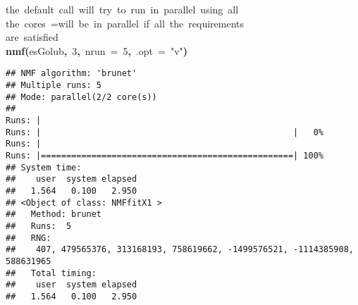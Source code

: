 \documentclass[a4paper]{article}\usepackage{graphicx, color}
\makeatletter
\newcommand{\hlnumber}[1]{\textcolor[rgb]{0,0,0}{#1}}%
\newcommand{\hlfunctioncall}[1]{\textcolor[rgb]{0.501960784313725,0,0.329411764705882}{\textbf{#1}}}%
\newcommand{\hlstring}[1]{\textcolor[rgb]{0.6,0.6,1}{#1}}%
\newcommand{\hlkeyword}[1]{\textcolor[rgb]{0,0,0}{\textbf{#1}}}%
\newcommand{\hlargument}[1]{\textcolor[rgb]{0.690196078431373,0.250980392156863,0.0196078431372549}{#1}}%
\newcommand{\hlcomment}[1]{\textcolor[rgb]{0.180392156862745,0.6,0.341176470588235}{#1}}%
\newcommand{\hlsymbol}[1]{\textcolor[rgb]{0,0,0}{#1}}%
\newcommand{\hlstd}[1]{\textcolor[rgb]{0,0,0}{#1}}%
\newenvironment{kframe}{%
 \def\FrameCommand##1{\hskip\@totalleftmargin \hskip-\fboxsep
 \colorbox{shadecolor}{##1}\hskip-\fboxsep
     \hskip-\linewidth \hskip-\@totalleftmargin \hskip\columnwidth}%
 \MakeFramed {\advance\hsize-\width
   \@totalleftmargin\z@ \linewidth\hsize
   \@setminipage}}%
 {\par\unskip\endMakeFramed}
\newenvironment{knitrout}{}{} %
\makeatother
\begin{document}
\begin{knitrout}
\color{fgcolor}\begin{kframe}
\begin{flushleft}
\ttfamily\noindent
\hlcomment{\usebox{\hlnormalsizeboxhash}{\ }the{\ }default{\ }call{\ }will{\ }try{\ }to{\ }run{\ }in{\ }parallel{\ }using{\ }all}\hspace*{\fill}\\
\hlstd{}\hlcomment{\usebox{\hlnormalsizeboxhash}{\ }the{\ }cores{\ }=\usebox{\hlnormalsizeboxgreaterthan}{\ }will{\ }be{\ }in{\ }parallel{\ }if{\ }all{\ }the{\ }requirements}\hspace*{\fill}\\
\hlstd{}\hlcomment{\usebox{\hlnormalsizeboxhash}{\ }are{\ }satisfied}\hspace*{\fill}\\
\hlstd{}\hlfunctioncall{nmf}\hlkeyword{(}\hlsymbol{esGolub}\hlkeyword{,}{\ }\hlnumber{3}\hlkeyword{,}{\ }\hlargument{nrun}{\ }\hlargument{=}{\ }\hlnumber{5}\hlkeyword{,}{\ }\hlargument{.opt}{\ }\hlargument{=}{\ }\hlstring{"{}v"{}}\hlkeyword{)}\mbox{}
\normalfont
\end{flushleft}
\begin{verbatim}
## NMF algorithm: 'brunet'
## Multiple runs: 5
## Mode: parallel(2/2 core(s))
## 
Runs: |                                                        
Runs: |                                                  |   0%
Runs: |                                                        
Runs: |==================================================| 100%
## System time:
##    user  system elapsed 
##   1.564   0.100   2.950 
## <Object of class: NMFfitX1 >
##   Method: brunet 
##   Runs:  5 
##   RNG:
##    407, 479565376, 313168193, 758619662, -1499576521, -1114385908, 588631965 
##   Total timing:
##    user  system elapsed 
##   1.564   0.100   2.950 
\end{verbatim}
\end{kframe}
\end{knitrout}
\end{document}
